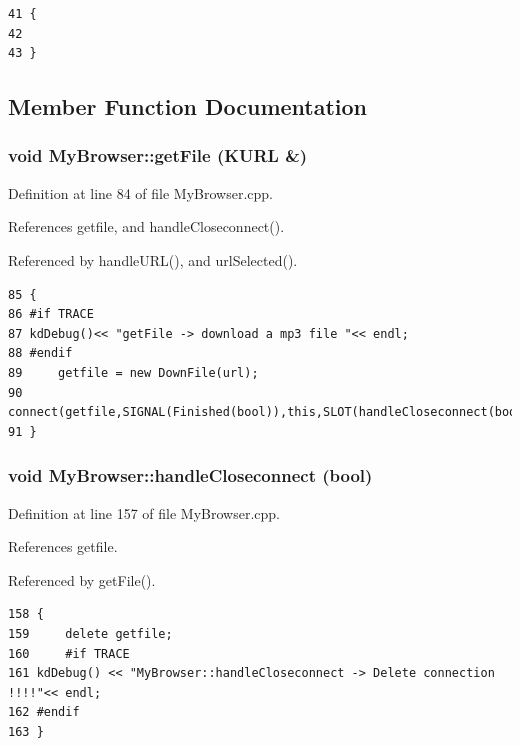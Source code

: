 \footnotesize\begin{verbatim}41 {
42 
43 }
\end{verbatim}\normalsize 


\subsection{Member Function Documentation}
\subsubsection{\setlength{\rightskip}{0pt plus 5cm}void My\-Browser::get\-File (KURL \&)}\label{classMyBrowser_MyBrowsera5}




Definition at line 84 of file My\-Browser.cpp.

References getfile, and handle\-Closeconnect().

Referenced by handle\-URL(), and url\-Selected().



\footnotesize\begin{verbatim}85 {
86 #if TRACE 
87 kdDebug()<< "getFile -> download a mp3 file "<< endl;
88 #endif
89     getfile = new DownFile(url);
90     connect(getfile,SIGNAL(Finished(bool)),this,SLOT(handleCloseconnect(bool)));
91 }
\end{verbatim}\normalsize 
{}
\subsubsection{\setlength{\rightskip}{0pt plus 5cm}void My\-Browser::handle\-Closeconnect (bool)\hspace{0.3cm}{\tt  [slot]}}\label{classMyBrowser_MyBrowseri5}




Definition at line 157 of file My\-Browser.cpp.

References getfile.

Referenced by get\-File().



\footnotesize\begin{verbatim}158 {
159     delete getfile;
160     #if TRACE     
161 kdDebug() << "MyBrowser::handleCloseconnect -> Delete connection !!!!"<< endl;
162 #endif    
163 }
\end{verbatim}\normalsize 
{}
